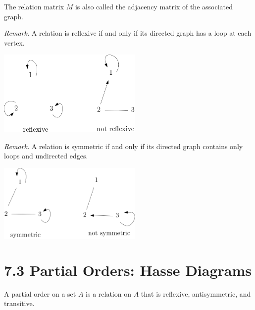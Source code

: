 \documentclass[11pt]{article}
\begin{document}
    The relation matrix $M$ is also called the adjacency matrix of the associated graph.

    \pagebreak

    \emph{Remark.} A relation is reflexive if and only if its directed graph has a loop at each vertex.

    \begin{center}
        \includegraphics[width=7cm]{graph3.png}
    \end{center}

    \emph{Remark.} A relation is symmetric if and only if its directed graph contains only loops and undirected edges.

    \begin{center}
        \includegraphics[width=7cm]{graph4.png}
    \end{center}

    \pagebreak

    \section{7.3 Partial Orders: Hasse Diagrams}

    A partial order on a set $A$ is a relation on $A$ that is reflexive, antisymmetric, and transitive.

    \vspace{1em}
\end{document}
